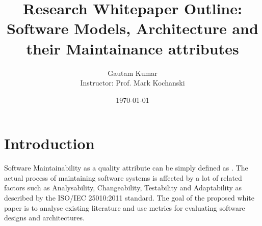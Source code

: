 \documentclass[dvips,12pt]{article}
\begin{document}

\title{Research Whitepaper Outline: \\
Software Models, Architecture and their Maintainance attributes}
\author{Gautam Kumar\\
Instructor: Prof. Mark Kochanski}
\date{\today}


\maketitle


\section{Introduction}

Software Maintainability as a quality attribute can be simply defined as
\cite{zhu_software_2005}. The actual process of maintaining software systems is affected by a lot of related factors such as Analysability, Changeability, Testability and Adaptability as described by the ISO/IEC 25010:2011 standard. The goal of the proposed white paper is to analyse existing literature and use metrics for evaluating software designs and architectures.
\end{document}
